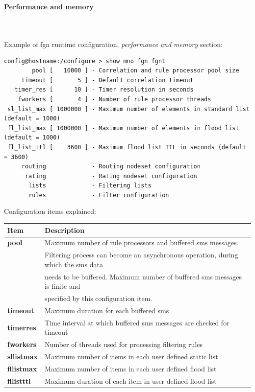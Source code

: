 \documentclass[a4paper,latin]{paper}
\begin{document}
\paragraph{Performance and memory}\label{SECTION_PERF_MEM}
\mbox{}\\\\
Example of \acrfull{fgn} runtime configuration, \textit{performance and memory} section:
\begin{lstlisting}[style=BashInputStyle, belowskip=\baselineskip]
config@hostname:/configure > show mno fgn fgn1
        pool [   10000 ] - Correlation and rule processor pool size
     timeout [       5 ] - Default correlation timeout             
   timer_res [      10 ] - Timer resolution in seconds
    fworkers [       4 ] - Number of rule processor threads
 sl_list_max [ 1000000 ] - Maximum number of elements in standard list (default = 1000)
 fl_list_max [ 1000000 ] - Maximum number of elements in flood list (default = 1000)
 fl_list_ttl [    3600 ] - Maximum flood list TTL in seconds (default = 3600)
     routing             - Routing nodeset configuration                     
      rating             - Rating nodeset configuration 
       lists             - Filtering lists             
       rules             - Filter configuration
\end{lstlisting}

\noindent{}Configuration items explained:\\
\begin{tabularx}{\textwidth}{ | l | X | }
	\hline
	Item	 						& Description \\
	\hline
	\textbf{pool}						& Maximum number of rule processors and buffered \acrfull{sms} messages.\\
								& Filtering process can become an asynchronous operation, during which the \acrshort{sms} data \\
								& needs to be buffered. Maximum number of buffered \acrshort{sms} messages is finite and\\
								& specified by this configuration item. \\
	\textbf{timeout}					& Maximum duration for each buffered \acrshort{sms} \\
	\textbf{timer\textunderscore{}res}			& Time interval at which buffered \acrshort{sms} messages are checked for timeout \\
	\textbf{fworkers}					& Number of threads used for processing filtering rules \\
	\textbf{sl\textunderscore{}list\textunderscore{}max}	& Maximum number of items in each user defined static list \\
	\textbf{fl\textunderscore{}list\textunderscore{}max}	& Maximum number of items in each user defined flood list \\
	\textbf{fl\textunderscore{}list\textunderscore{}ttl}	& Maximum duration of each item in user defined flood list \\
	\hline
\end{tabularx}\\\\
\clearpage
\end{document}
